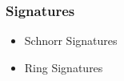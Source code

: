 \begin{frame}
	\frametitle{Signatures}

	\begin{itemize}
		\item Schnorr Signatures
		\item Ring Signatures
	\end{itemize}
\end{frame}
